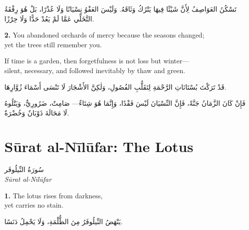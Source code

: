 \documentclass[11pt,a4paper,twoside]{book}
\begin{document}
\begin{flushright}
{\arabicfont
تَسْكُنُ العَوَاصِفُ لِأَنَّ شَيْئًا فِيهَا يَتْرُكُ وَثَاقَهُ.
وَلَيْسَ العَفْوُ نِسْيَانًا وَلَا عُذْرًا،
بَلْ هُوَ رِفْقَةُ التَّخَلِّي عَمَّا لَمْ يَعُدْ حَدًّا وَلَا حِرْزًا.}
\end{flushright}

\vspace{1em}
{\color{indigo}\bfseries 2.}\quad
You abandoned orchards of mercy because the seasons changed;\\
yet the trees still remember you.

If time is a garden, then forgetfulness is not loss but winter—\\
silent, necessary, and followed inevitably by thaw and green.

\begin{flushright}
{\arabicfont
قَدْ تَرَكْتَ بُسْتَانَاتِ الرَّحْمَةِ لِتَقَلُّبِ الفُصُولِ،
وَلٰكِنَّ الأَشْجَارَ لَا تَنْسَى أَسْمَاءَ زُوَّارِهَا.

فَإِنْ كَانَ الزَّمَانُ جَنَّةً،
فَإِنَّ النِّسْيَانَ لَيْسَ فَقْدًا،
وَإِنَّمَا هُوَ شِتَاءٌ—
صَامِتٌ، ضَرُورِيٌّ،
وَيَتْلُوهُ لَا مَحَالَةَ ذَوْبَانٌ وَخُضْرَةٌ.}
\end{flushright}

\clearpage


\chapter*{Sūrat al-Nīlūfar: The Lotus}
\begin{center}
{\arabicfont\Large سُورَةُ النِّيلُوفَر}\\[5pt]
{\small\itshape Sūrat al-Nīlūfar}
\end{center}
\vspace{1em}

{\color{indigo}\bfseries 1.}\quad
The lotus rises from darkness,\\
yet carries no stain.

\begin{flushright}
{\arabicfont
يَنْهَضُ النِّيلُوفَرُ مِنَ الظُّلْمَةِ،
وَلَا يَحْمِلُ دَنَسًا.}
\end{flushright}
\end{document}
